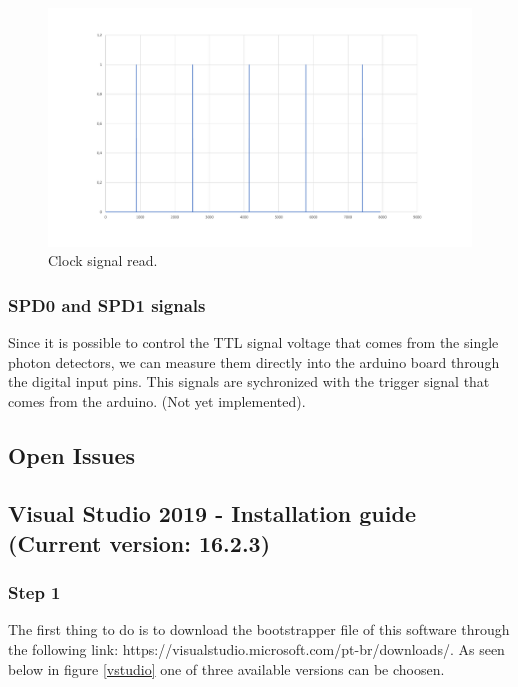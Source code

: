 \begin{refsection}
	\begin{figure}[H]
		\centering
		\includegraphics[width=1\linewidth]{./sdf/arduino_quantum_rx/figures/clockSignal2.pdf}
		\caption{Clock signal read.}
		\label{montage}
	\end{figure}

\subsubsection{SPD0 and SPD1 signals}

Since it is possible to control the TTL signal voltage that comes from the single photon detectors, we can measure them directly into the arduino board through the digital input pins. This signals are sychronized with the trigger signal that comes from the arduino. (Not yet implemented).
	
	
	\subsection{Open Issues}
	
	\clearpage
	\subsection{Visual Studio 2019 - Installation guide (Current version: 16.2.3)}
	
	\subsubsection{Step 1}
	
	The first thing to do is to download the bootstrapper file of this software through the following link: https://visualstudio.microsoft.com/pt-br/downloads/. As seen below in figure \ref{vstudio} one of three available versions can be choosen.
	

\end{refsection}

